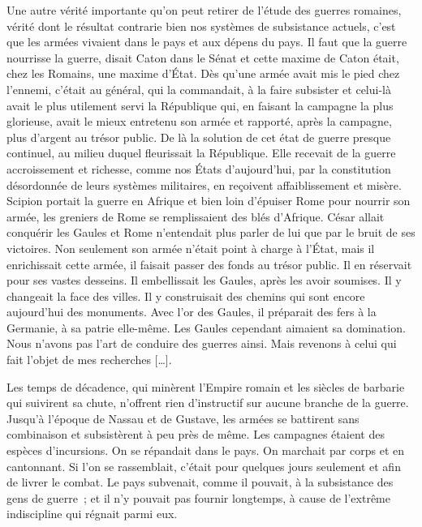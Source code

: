 \documentclass[french,twoside]{book} %
\begin{document}
Une autre vérité importante qu’on peut retirer de l’étude des guerres romaines, vérité dont le résultat contrarie bien nos systèmes de subsistance actuels, c’est que les armées vivaient dans le pays et aux dépens du pays. Il faut que la guerre nourrisse la guerre, disait Caton dans le Sénat et cette maxime de Caton était, chez les Romains, une maxime d’État. Dès qu’une armée avait mis le pied chez l’ennemi, c’était au général, qui la commandait, à la faire subsister et celui-là avait le plus utilement servi la République qui, en faisant la campagne la plus glorieuse, avait le mieux entretenu son armée et rapporté, après la campagne, plus d’argent au trésor public. De là la solution de cet état de guerre presque continuel, au milieu duquel fleurissait la République. Elle recevait de la guerre accroissement et richesse, comme nos États d’aujourd’hui, par la constitution désordonnée de leurs systèmes militaires, en reçoivent affaiblissement et misère. Scipion portait la guerre en Afrique et bien loin d’épuiser Rome pour nourrir son armée, les greniers de Rome se remplissaient des blés d’Afrique. César allait conquérir les Gaules et Rome n’entendait plus parler de lui que par le bruit de ses victoires. Non seulement son armée n’était point à charge à l’État, mais il enrichissait cette armée, il faisait passer des fonds au trésor public. Il en réservait pour ses vastes desseins. Il embellissait les Gaules, après les avoir soumises. Il y changeait la face des villes. Il y construisait des chemins qui sont encore aujourd’hui des monuments. Avec l’or des Gaules, il préparait des fers à la Germanie, à sa patrie elle-même. Les Gaules cependant aimaient sa domination. Nous n’avons pas l’art de conduire des guerres ainsi. Mais revenons à celui qui fait l’objet de mes recherches […].\par
Les temps de décadence, qui minèrent l’Empire romain et les siècles de barbarie qui suivirent sa chute, n’offrent rien d’instructif sur aucune branche de la guerre. Jusqu’à l’époque de Nassau et de Gustave, les armées se battirent sans combinaison et subsistèrent à peu près de même. Les campagnes étaient des espèces d’incursions. On se répandait dans le pays. On marchait par corps et en cantonnant. Si l’on se rassemblait, c’était pour quelques jours seulement et afin de livrer le combat. Le pays subvenait, comme il pouvait, à la subsistance des gens de guerre ; et il n’y pouvait pas fournir longtemps, à cause de l’extrême indiscipline qui régnait parmi eux.\par
\end{document}
